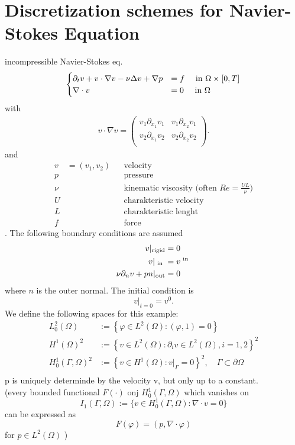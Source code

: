 \section{Discretization schemes for Navier-Stokes Equation}
incompressible Navier-Stokes eq.
\begin{align*}
	\begin{cases}
	\partial_t v + v \cdot \nabla v - \nu \Delta v + \nabla p &= f \quad \text{ in } \Omega \times [0,T]\\
	\nabla \cdot v &=0 \quad \text{ in } \Omega 
	\end{cases}
\end{align*}
with 
\begin{align*}
	v \cdot \nabla v  =
	\begin{pmatrix}
	v_1 \partial_{x_1}v_1& v_1\partial_{x_2}v_1\\
	v_2 \partial_{x_1}v_2& v_2\partial_{x_2}v_2\\
	\end{pmatrix}.
\end{align*}
and 
\begin{align*}
	v &= (v_1,v_2) && \text{velocity}\\
	p&&& \text{pressure}\\
	\nu &&& \text{kinematic viscosity (often } Re = \frac{UL}{\nu})\\
	U && &\text{charakteristic velocity}\\
	L && &\text{charakteristic lenght}\\
	f && &\text{force }
\end{align*}.
The following boundary conditions are assumed
\begin{align*}
	v|_{\text{rigid}} &= 0\\
	v|_{\text{ in }} &= v^{\text{ in }}\\
	\nu \partial_nv+ pn|_{\text{out}} &=0\\
\end{align*}
where $n$ is the outer normal. The initial condition is
\begin{equation*}
	v|_{t=0}=v^0.
\end{equation*}
We define the following spaces for this example:
\begin{align*}
	L^2_0(\Omega) &:= \left \{ \varphi \in L^2(\Omega)\colon (\varphi,1)=0  \right\}\\
	H^1(\Omega)^2 &:= \left \{ v \in L^2(\Omega)\colon \partial_i v \in L^2(\Omega), i=1,2  \right\}^2\\
	H^1_0(\Gamma,\Omega)^2 &:= \left \{ v \in H^1(\Omega)\colon v|_\Gamma =0 \right\}^2, \quad \Gamma \subset \partial \Omega\\
\end{align*}
p is uniquely determinde by the velocity v, but only up to a constant.\\
(every bounded functional $F(\cdot)$ onj $H^1_0(\Gamma,\Omega)$ which vanishes on 
\begin{equation*}
	I_1(\Gamma,\Omega) := \{v \in H^1_0(\Gamma,\Omega)\colon \nabla\cdot v =0 \}
\end{equation*}
can be expressed as 
\begin{equation*}
	F(\varphi) = (p, \nabla \cdot \varphi)
\end{equation*}
for $p \in L^2(\Omega)$ )\\
